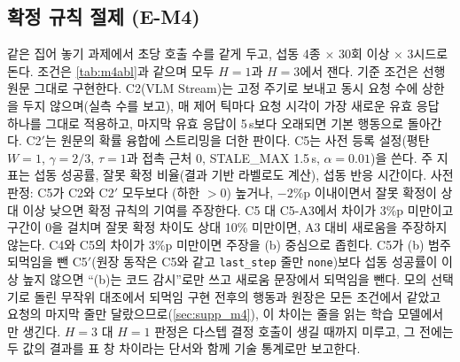 \subsection{확정 규칙 절제 (E-M4)}
\label{sec:plan_m4}
같은 집어 놓기 과제에서 초당 호출 수를 같게 두고, 섭동 4종 $\times$ 30회 이상 $\times$ 3시드로 돈다. 조건은 \cref{tab:m4abl}과 같으며 모두 $H=1$과 $H=3$에서 잰다. 기준 조건은 선행 원문 그대로 구현한다. C2(VLM Stream)는 고정 주기로 보내고 동시 요청 수에 상한을 두지 않으며(실측 수를 보고), 매 제어 틱마다 요청 시각이 가장 새로운 유효 응답 하나를 그대로 적용하고, 마지막 유효 응답이 5\,s보다 오래되면 기본 행동으로 돌아간다. C2$'$는 원문의 확률 융합에 스트리밍을 더한 판이다. C5는 사전 등록 설정(평탄 $W=1$, $\gamma=2/3$, $\tau=1$과 접촉 근처 0, STALE\_MAX 1.5\,s, $\alpha=0.01$)을 쓴다. 주 지표는 섭동 성공률, 잘못 확정 비율(결과 기반 라벨로도 계산), 섭동 반응 시간이다. 사전 판정: C5가 C2와 C2$'$ 모두보다 (하한 $>0$) 높거나, $-2$\%p 이내이면서 잘못 확정이 상대  이상 낮으면 확정 규칙의 기여를 주장한다. C5 대 C5-A3에서 차이가 3\%p 미만이고 구간이 0을 걸치며 잘못 확정 차이도 상대 10\% 미만이면, A3 대비 새로움을 주장하지 않는다. C4와 C5의 차이가 3\%p 미만이면 주장을 (b) 중심으로 좁힌다. C5가 (b) 범주 되먹임을 뺀 C5$'$(원장 동작은 C5와 같고 \texttt{last\_step} 줄만 \texttt{none})보다 섭동 성공률이  이상 높지 않으면 ``(b)는 코드 감시''로만 쓰고 새로움 문장에서 되먹임을 뺀다. 모의 선택기로 돌린 무작위 대조에서 되먹임 구현 전후의 행동과 원장은 모든 조건에서 같았고 요청의 마지막 줄만 달랐으므로(\cref{sec:supp_m4}), 이 차이는 줄을 읽는 학습 모델에서만 생긴다. $H=3$ 대 $H=1$ 판정은 다스텝 결정 호출이 생길 때까지 미루고, 그 전에는 두 값의 결과를 표 창 차이라는 단서와 함께 기술 통계로만 보고한다.


